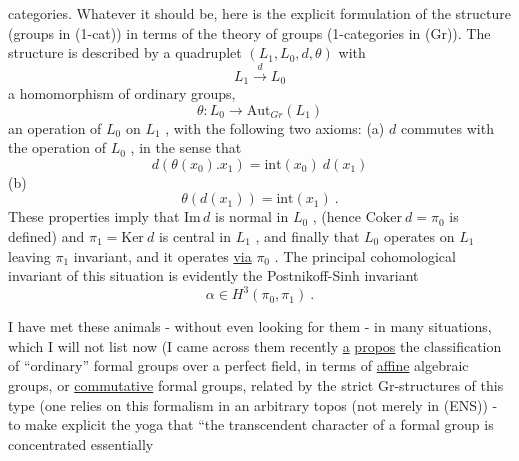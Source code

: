 
categories. Whatever it should be, here is the explicit formulation
of the structure (groups in (1-cat)) in terms of the theory of
groups (1-categories in (Gr)). The structure is described by a
quadruplet $(L_1, L_0, d,\theta)$ with
\[ L_1 \xrightarrow{\ d\ } L_0 \]
a homomorphism of ordinary groups,
\[ \theta : L_0 \longrightarrow \mathrm{Aut}_{Gr}(L_1) \]
an operation of $L_0$ on $L_1$ , with the following two axioms:
(a) $d$ commutes with the operation of $L_0$ , in the
sense that
\[ d(\theta(x_0).x_1) = \mathrm{int}(x_0)\ d(x_1) \]
(b) \[ \theta(d(x_1)) = \mathrm{int}(x_1) \ . \]
These properties imply that $\mathrm{Im}\, d$ is normal in $L_0$ , (hence
$\mathrm{Coker}\ d = \pi_0$ is defined) and $\pi_1 = \mathrm{Ker}\ d$ is central in $L_1$ ,
and finally that $L_0$ operates on $L_1$ leaving $\pi_1$ invariant,
and it operates \uline{via} $\pi_0$ . The principal cohomological invariant
of this situation is evidently the Postnikoff-Sinh invariant
\[ \alpha \in H^3(\pi_0, \pi_1) \ . \]

I have met these animals - without even looking for them -
in many situations, which I will not list now (I came across them
recently \uline{a} \uline{propos} the classification of ``ordinary'' formal groups
over a perfect field, in terms of \uline{affine} algebraic groups, or
\uline{commutative} formal groups, related by the strict Gr-structures of
this type (one relies on this formalism in an arbitrary topos
(not merely in (ENS)) - to make explicit the yoga that ``the
transcendent character of a formal group is concentrated essentially

